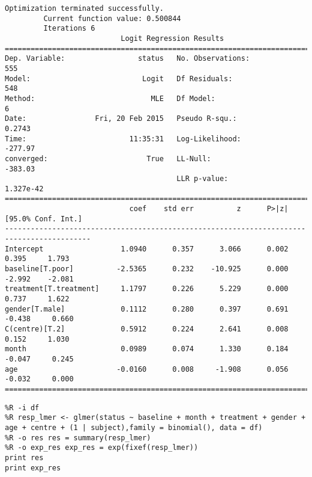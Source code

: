 \documentclass[12pt,fleqn]{article}\usepackage{../common}
\begin{document}
\begin{verbatim}
Optimization terminated successfully.
         Current function value: 0.500844
         Iterations 6
                           Logit Regression Results                           
==============================================================================
Dep. Variable:                 status   No. Observations:                  555
Model:                          Logit   Df Residuals:                      548
Method:                           MLE   Df Model:                            6
Date:                Fri, 20 Feb 2015   Pseudo R-squ.:                  0.2743
Time:                        11:35:31   Log-Likelihood:                -277.97
converged:                       True   LL-Null:                       -383.03
                                        LLR p-value:                 1.327e-42
==========================================================================================
                             coef    std err          z      P>|z|      [95.0% Conf. Int.]
------------------------------------------------------------------------------------------
Intercept                  1.0940      0.357      3.066      0.002         0.395     1.793
baseline[T.poor]          -2.5365      0.232    -10.925      0.000        -2.992    -2.081
treatment[T.treatment]     1.1797      0.226      5.229      0.000         0.737     1.622
gender[T.male]             0.1112      0.280      0.397      0.691        -0.438     0.660
C(centre)[T.2]             0.5912      0.224      2.641      0.008         0.152     1.030
month                      0.0989      0.074      1.330      0.184        -0.047     0.245
age                       -0.0160      0.008     -1.908      0.056        -0.032     0.000
==========================================================================================
\end{verbatim}



\begin{verbatim}
%R -i df 
%R resp_lmer <- glmer(status ~ baseline + month + treatment + gender + age + centre + (1 | subject),family = binomial(), data = df)
%R -o res res = summary(resp_lmer)
%R -o exp_res exp_res = exp(fixef(resp_lmer))
print res
print exp_res
\end{verbatim}
\end{document}
